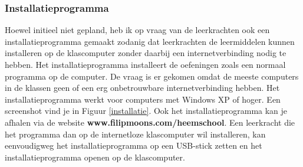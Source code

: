 \documentclass[a4paper,11pt]{article}
\theoremstyle{definition}
\begin{document}
\subsubsection{Installatieprogramma}
Hoewel initieel niet gepland, heb ik op vraag van de leerkrachten ook een installatieprogramma gemaakt 
zodanig dat leerkrachten de leermiddelen kunnen installeren op de klascomputer zonder daarbij een internetverbinding nodig te hebben. 
Het installatieprogramma installeert de oefeningen zoals een normaal programma op 
de computer.
De vraag is er gekomen omdat de meeste computers in de klassen geen of een erg onbetrouwbare 
internetverbinding hebben.  Het installatieprogramma werkt voor 
computers met Windows XP of hoger. Een screenshot vind 
je in Figuur \ref{installatie}. Ook het installatieprogramma kan je afhalen via 
de website \textbf{www.filipmoons.com/heemschool}. Een leerkracht die het 
programma dan op de internetloze klascomputer wil installeren, kan eenvoudigweg het 
installatieprogramma op een USB-stick zetten en het installatieprogramma openen op de klascomputer.
\end{document}
